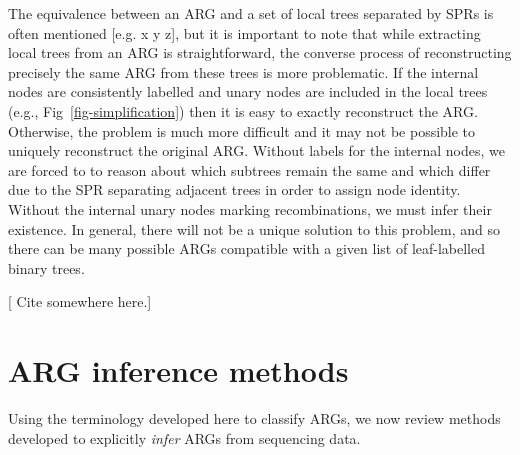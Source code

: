 \documentclass{article}
\begin{document}
The equivalence between an ARG and a set of local trees
separated by SPRs is often mentioned [e.g. x y z], but
it is important to note that while extracting local
trees from an ARG is straightforward, the converse
process of reconstructing precisely the same ARG from
these trees is more problematic. If the internal
nodes are consistently labelled and unary nodes are
included in the local trees (e.g., Fig~\ref{fig-simplification})
then it is easy to exactly reconstruct the ARG.
Otherwise, the problem is much more difficult and it
may not be possible to uniquely reconstruct the original ARG.
Without labels for the internal nodes, we are forced to
to reason about which subtrees remain the same and which
differ due to the SPR separating adjacent trees in order to
assign node identity. Without the internal unary nodes marking
recombinations, we must infer their existence. In
general, there will not be a unique solution to this problem,
and so there can be many possible ARGs compatible with
a given list of
leaf-labelled binary trees.

[ Cite \citep{deng2021distribution} somewhere here.]



\section*{ARG inference methods}
Using the terminology developed here to classify ARGs, we now review methods developed
to explicitly \emph{infer} ARGs from sequencing data.
\end{document}
